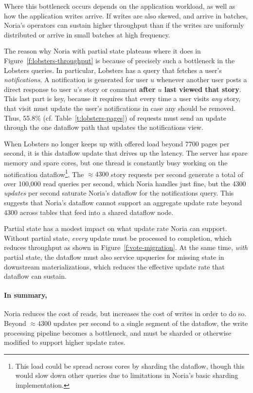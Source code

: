 Where this bottleneck occurs depends on the application workload, as well as how
the application writes arrive. If writes are also skewed, and arrive in batches,
Noria's operators can sustain higher throughput than if the writes are uniformly
distributed or arrive in small batches at high frequency.

The reason why Noria with partial state plateaus where it does in
Figure~\vref{f:lobsters-throughput} is because of precisely such a bottleneck in
the Lobsters queries. In particular, Lobsters has a query that fetches a user's
\emph{notifications}. A notification is generated for user $u$ whenever another
user posts a direct response to user $u$'s story or comment \textbf{after $u$
last viewed that story}. This last part is key, because it requires that every
time a user visits \emph{any} story, that visit must update the user's
notifications in case any should be removed. Thus, 55.8\% (cf.
Table~\vref{t:lobsters-pages}) of requests must send an update through the one
dataflow path that updates the notifications view.

When Lobsters no longer keeps up with offered load beyond 7700 pages per second,
it is this dataflow update that drives up the latency. The server has spare
memory and spare cores, but one thread is constantly busy working on the
notification dataflow\footnote{This load could be spread across cores by
sharding the dataflow, though this would slow down other queries due to
limitations in Noria's basic sharding implementation.}. The $\approx4300$ story
requests per second generate a total of over 100,000 read queries per second,
which Noria handles just fine, but the 4300 \emph{updates} per second saturate
Noria's dataflow for the notifications query. This suggests that Noria's
dataflow cannot support an aggregate update rate beyond 4300 across tables that
feed into a shared dataflow node.

Partial state has a modest impact on what update rate Noria can support. Without
partial state, \emph{every} update must be processed to completion, which
reduces throughput as shown in Figure~\vref{f:vote-migration}. At the same time,
\emph{with} partial state, the dataflow must also service upqueries for missing
state in downstream materializations, which reduces the effective update rate
that dataflow can sustain.

\paragraph{In summary,} Noria reduces the cost of reads, but increases the cost
of writes in order to do so. Beyond $\approx4300$ updates per second to a single
segment of the dataflow, the write processing pipeline becomes a bottleneck, and
must be sharded or otherwise modified to support higher update rates.
